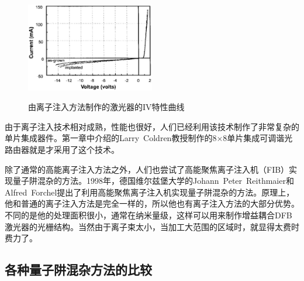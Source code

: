 \documentclass{ZJUthesis}
\begin{document}
\begin{figure}[htbp]
  \centering
  \includegraphics[width=0.5\textwidth]{./Pictures/implantation_laser.eps}\\
  \caption{由离子注入方法制作的激光器的IV特性曲线}
  \label{fig_implantation_laser}
\end{figure}

由于离子注入技术相对成熟，性能也很好，人们已经利用该技术制作了非常复杂的单片集成器件。第一章中介绍的Larry~Coldren教授制作的8$\times$8单片集成可调谐光路由器就是才采用了这个技术。

除了通常的高能离子注入方法之外，人们也尝试了高能聚焦离子注入机（FIB）实现量子阱混杂的方法。1998年，德国维尔兹堡大学的Johann~Peter~Reithmaier和Alfred~Forchel提出了利用高能聚焦离子注入机实现量子阱混杂的方法\cite{Reithmaier1998Focused}。原理上，他和普通的离子注入方法是完全一样的，所以他也有离子注入方法的大部分优势。不同的是他的处理面积很小，通常在纳米量级，这样可以用来制作增益耦合DFB激光器的光栅结构。当然由于离子束太小，当加工大范围的区域时，就显得太费时费力了。

\subsection{各种量子阱混杂方法的比较}
\end{document}
